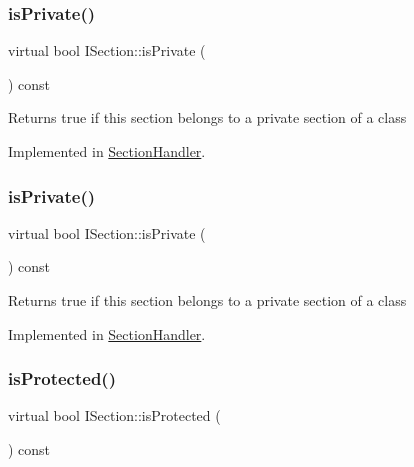 \mbox{\label{class_i_section_ad205fa5a5150643b8275f3f4ef3759d8}} 
\subsubsection{\texorpdfstring{isPrivate()}{isPrivate()}\hspace{0.1cm}{\footnotesize\ttfamily [1/2]}}
{\footnotesize\ttfamily virtual bool I\+Section\+::is\+Private (\begin{DoxyParamCaption}{ }\end{DoxyParamCaption}) const\hspace{0.3cm}{\ttfamily [pure virtual]}}

Returns {\ttfamily true} if this section belongs to a private section of a class 

Implemented in \mbox{\hyperlink{class_section_handler_a9539ef23b026485059539a38f77ba63a}{Section\+Handler}}.

\mbox{\label{class_i_section_ad205fa5a5150643b8275f3f4ef3759d8}} 
\subsubsection{\texorpdfstring{isPrivate()}{isPrivate()}\hspace{0.1cm}{\footnotesize\ttfamily [2/2]}}
{\footnotesize\ttfamily virtual bool I\+Section\+::is\+Private (\begin{DoxyParamCaption}{ }\end{DoxyParamCaption}) const\hspace{0.3cm}{\ttfamily [pure virtual]}}

Returns {\ttfamily true} if this section belongs to a private section of a class 

Implemented in \mbox{\hyperlink{class_section_handler_a9539ef23b026485059539a38f77ba63a}{Section\+Handler}}.

\mbox{\label{class_i_section_afdd0506cd65ce59c8fecc060ef813592}} 
\subsubsection{\texorpdfstring{isProtected()}{isProtected()}\hspace{0.1cm}{\footnotesize\ttfamily [1/2]}}
{\footnotesize\ttfamily virtual bool I\+Section\+::is\+Protected (\begin{DoxyParamCaption}{ }\end{DoxyParamCaption}) const\hspace{0.3cm}{\ttfamily [pure virtual]}}

